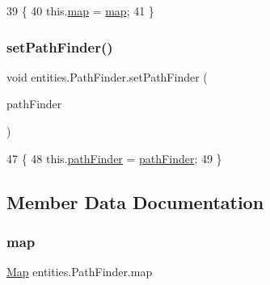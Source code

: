 \begin{DoxyCode}
39                                 \{
40         this.\mbox{\hyperlink{classentities_1_1_path_finder_a55024473615fc2ba75d7faf5dcd78b3f}{map}} = \mbox{\hyperlink{classentities_1_1_path_finder_a55024473615fc2ba75d7faf5dcd78b3f}{map}};
41     \}
\end{DoxyCode}
\mbox{\label{classentities_1_1_path_finder_acf5f6e67e696814ab392055be456af7a}} 
\subsubsection{\texorpdfstring{set\+Path\+Finder()}{setPathFinder()}}
{\footnotesize\ttfamily void entities.\+Path\+Finder.\+set\+Path\+Finder (\begin{DoxyParamCaption}\item[{\mbox{\hyperlink{classorg_1_1newdawn_1_1slick_1_1util_1_1pathfinding_1_1_a_star_path_finder}{A\+Star\+Path\+Finder}}}]{path\+Finder }\end{DoxyParamCaption})\hspace{0.3cm}{\ttfamily [inline]}}


\begin{DoxyCode}
47                                                           \{
48         this.\mbox{\hyperlink{classentities_1_1_path_finder_a3ee55002f6ed410109207b43757e93f7}{pathFinder}} = \mbox{\hyperlink{classentities_1_1_path_finder_a3ee55002f6ed410109207b43757e93f7}{pathFinder}};
49     \}
\end{DoxyCode}


\subsection{Member Data Documentation}
\mbox{\label{classentities_1_1_path_finder_a55024473615fc2ba75d7faf5dcd78b3f}} 
\subsubsection{\texorpdfstring{map}{map}}
{\footnotesize\ttfamily \mbox{\hyperlink{classentities_1_1_map}{Map}} entities.\+Path\+Finder.\+map\hspace{0.3cm}{\ttfamily [private]}}

